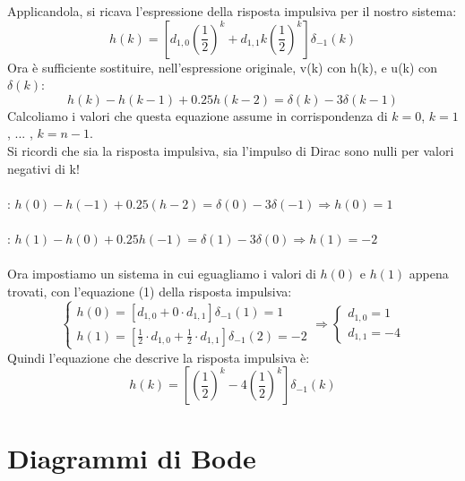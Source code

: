 \documentclass[12pt,a4paper]{article}
\begin{document}
\begin{enumerate}
\[		\]
		Applicandola, si ricava l'espressione della risposta impulsiva per il nostro sistema:
		\begin{equation}
			h(k) = \left[d_{1,0}\left(\frac{1}{2}\right)^k + d_{1,1}k\left(\frac{1}{2}\right)^k\right]\delta_{-1}(k)
		\end{equation}
		Ora \`e sufficiente sostituire, nell'espressione originale, v(k) con h(k), e u(k) con $\delta(k)$:
		\[
			h(k) - h(k-1) + 0.25h(k-2) = \delta(k) - 3\delta(k-1)
		\]
		Calcoliamo i valori che questa equazione assume in corrispondenza di $k=0$, $k=1$, ... , $k=n-1$.\\
		Si ricordi che sia la risposta impulsiva, sia l'impulso di Dirac sono nulli per valori negativi di k!\\ \\
		 : $h(0) - h(-1) + 0.25(h-2) = \delta(0) - 3\delta(-1) \Rightarrow h(0) = 1$\\ \\
		 : $h(1) - h(0) + 0.25h(-1) = \delta(1)- 3\delta(0)\Rightarrow h(1) = -2$\\ \\
		Ora impostiamo un sistema in cui eguagliamo i valori di $h(0)$ e $h(1)$ appena trovati, con l'equazione (1) della risposta impulsiva:\\
		\[
			\begin{cases}
				h(0) = \left[d_{1,0} + 0\cdot d_{1,1}\right]\delta_{-1}(1) = 1\\
				h(1) = \left[\frac{1}{2}\cdot d_{1,0} + \frac{1}{2}\cdot d_{1,1}\right]\delta_{-1}(2) = -2
			\end{cases}
			\Rightarrow
			\begin{cases}
				d_{1,0} = 1\\
				d_{1,1} = -4
			\end{cases}
		\]
		Quindi l'equazione che descrive la risposta impulsiva \`e:
		\[
			h(k) = \left[\left(\frac{1}{2}\right)^k -4\left(\frac{1}{2}\right)^k\right]\delta_{-1}(k)
		\]
	\end{enumerate}
	\newpage
	\section{Diagrammi di Bode}
\end{document}
